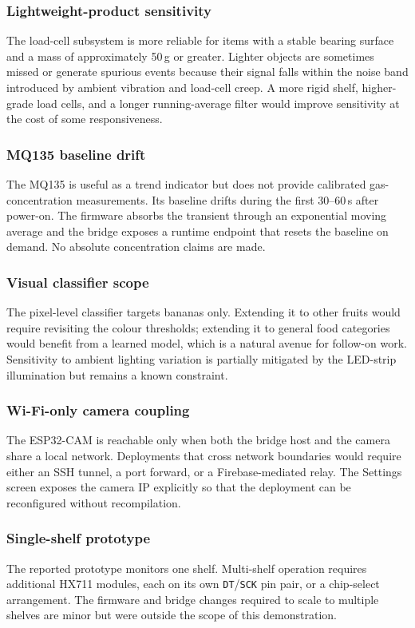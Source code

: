 \subsubsection{Lightweight-product sensitivity}
The load-cell subsystem is more reliable for items with a stable
bearing surface and a mass of approximately 50\,g or greater. Lighter
objects are sometimes missed or generate spurious events because
their signal falls within the noise band introduced by ambient
vibration and load-cell creep. A more rigid shelf, higher-grade load
cells, and a longer running-average filter would improve sensitivity
at the cost of some responsiveness.

\subsubsection{MQ135 baseline drift}
The MQ135 is useful as a trend indicator but does not provide
calibrated gas-concentration measurements. Its baseline drifts during
the first 30--60\,s after power-on. The firmware absorbs the
transient through an exponential moving average and the bridge
exposes a runtime endpoint that resets the baseline on demand. No
absolute concentration claims are made.

\subsubsection{Visual classifier scope}
The pixel-level classifier targets bananas only. Extending it to
other fruits would require revisiting the colour thresholds;
extending it to general food categories would benefit from a learned
model, which is a natural avenue for follow-on work. Sensitivity to
ambient lighting variation is partially mitigated by the LED-strip
illumination but remains a known constraint.

\subsubsection{Wi-Fi-only camera coupling}
The ESP32-CAM is reachable only when both the bridge host and the
camera share a local network. Deployments that cross network
boundaries would require either an SSH tunnel, a port forward, or a
Firebase-mediated relay. The Settings screen exposes the camera IP
explicitly so that the deployment can be reconfigured without
recompilation.

\subsubsection{Single-shelf prototype}
The reported prototype monitors one shelf. Multi-shelf operation
requires additional HX711 modules, each on its own \texttt{DT}/\texttt{SCK}
pin pair, or a chip-select arrangement. The firmware and bridge
changes required to scale to multiple shelves are minor but were
outside the scope of this demonstration.

